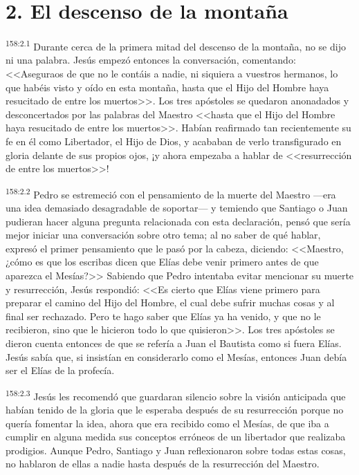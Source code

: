 \section*{2. El descenso de la montaña}
\par 
\textsuperscript{158:2.1} Durante cerca de la primera mitad del descenso de la montaña, no se dijo ni una palabra. Jesús empezó entonces la conversación, comentando: <<Aseguraos de que no le contáis a nadie, ni siquiera a vuestros hermanos, lo que habéis visto y oído en esta montaña, hasta que el Hijo del Hombre haya resucitado de entre los muertos>>. Los tres apóstoles se quedaron anonadados y desconcertados por las palabras del Maestro <<hasta que el Hijo del Hombre haya resucitado de entre los muertos>>. Habían reafirmado tan recientemente su fe en él como Libertador, el Hijo de Dios, y acababan de verlo transfigurado en gloria delante de sus propios ojos, ¡y ahora empezaba a hablar de <<resurrección de entre los muertos>>!

\par 
\textsuperscript{158:2.2} Pedro se estremeció con el pensamiento de la muerte del Maestro ---era una idea demasiado desagradable de soportar--- y temiendo que Santiago o Juan pudieran hacer alguna pregunta relacionada con esta declaración, pensó que sería mejor iniciar una conversación sobre otro tema; al no saber de qué hablar, expresó el primer pensamiento que le pasó por la cabeza, diciendo: <<Maestro, ¿cómo es que los escribas dicen que Elías debe venir primero antes de que aparezca el Mesías?>> Sabiendo que Pedro intentaba evitar mencionar su muerte y resurrección, Jesús respondió: <<Es cierto que Elías viene primero para preparar el camino del Hijo del Hombre, el cual debe sufrir muchas cosas y al final ser rechazado. Pero te hago saber que Elías ya ha venido, y que no le recibieron, sino que le hicieron todo lo que quisieron>>. Los tres apóstoles se dieron cuenta entonces de que se refería a Juan el Bautista como si fuera Elías. Jesús sabía que, si insistían en considerarlo como el Mesías, entonces Juan debía ser el Elías de la profecía.

\par 
\textsuperscript{158:2.3} Jesús les recomendó que guardaran silencio sobre la visión anticipada que habían tenido de la gloria que le esperaba después de su resurrección porque no quería fomentar la idea, ahora que era recibido como el Mesías, de que iba a cumplir en alguna medida sus conceptos erróneos de un libertador que realizaba prodigios. Aunque Pedro, Santiago y Juan reflexionaron sobre todas estas cosas, no hablaron de ellas a nadie hasta después de la resurrección del Maestro.

